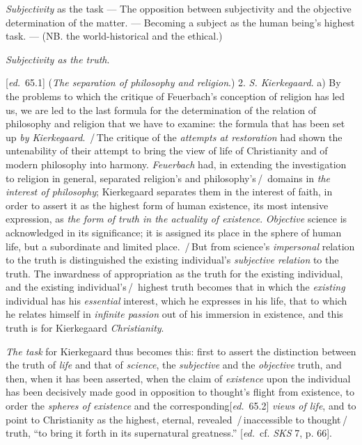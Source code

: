 \documentclass[12pt,a4paper,openany]{book}
\newcommand{\kpage}[1]{\marginnote{\footnotesize\textit{[#1]}}}
\newcommand{\ed}[1]{{\small[\textit{ed.}\ #1]}}
\newcommand{\ins}[1]{\,/\,#1\,/\,}
\newcommand{\lecture}[1]{\par\bigskip\noindent{\large #1}\par\nobreak\medskip}
\begin{document}
\emph{Subjectivity} as the task --- The opposition between subjectivity
and the objective determination of the matter. --- Becoming a
subject as the human being's highest task. --- (NB. the world-historical
and the ethical.)

\emph{Subjectivity as the truth}.

\lecture{\ed{Lecture 20 continued:}}

\ed{65.1} (\emph{The separation of philosophy and religion}.)
2. \emph{S. Kierkegaard}.
a) By the problems to which the critique of Feuerbach's conception of religion
has led us, we are led to the last formula for the determination
of the relation of philosophy and religion that we have to examine:
the formula that has been set up \emph{by Kierkegaard}. \ins{The critique of the \emph{attempts at restoration}\kpage{97}
had shown the untenability of their attempt to
bring the view of life of Christianity and of modern philosophy
into harmony. \emph{Feuerbach} had, in extending the investigation
to religion in general, separated religion's and philosophy's} domains
in \emph{the interest of philosophy}; Kierkegaard separates them in the interest of faith, in order
to assert it as the highest form of human existence,
its most intensive expression, as \emph{the form of truth in the actuality of existence}.
\emph{Objective} science is acknowledged in its significance; it is assigned its
place in the sphere of human life, but a subordinate and limited
place. \ins{But from science's \emph{impersonal} relation to the truth
is distinguished the existing individual's \emph{subjective relation} to the truth. The inwardness
of appropriation as the truth for the existing individual, and the existing individual's}
highest truth becomes that in which the \emph{existing} individual
has his \emph{essential} interest, which he expresses in his life, that to
which he relates himself in \emph{infinite passion} out of his immersion in
existence, and this truth is for Kierkegaard \emph{Christianity}.

\emph{The task} for Kierkegaard thus becomes this: first to assert the distinction
between the truth of \emph{life} and that of \emph{science}, the \emph{subjective} and
the \emph{objective} truth, and then, when it has been asserted, when the claim of \emph{existence}
upon the individual has been decisively made good in opposition to
thought's flight from existence, to order the \emph{spheres of existence} and the
corresponding\ed{65.2} \emph{views of life}, and to point to Christianity
as the highest, eternal, revealed \ins{inaccessible to thought}
truth, ``to bring it forth in its supernatural greatness.''
\ed{cf. \emph{SKS} 7, p. 66}.
\end{document}
